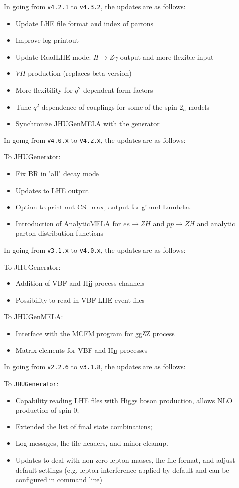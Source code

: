 \documentclass[aps,superscriptaddress,nofootinbib]{revtex4}
\begin{document}
\noindent
In going from \verb|v4.2.1| to \verb|v4.3.2|, the updates are as follows:

\begin{itemize}
\item Update LHE file format and index of partons
\item Improve log printout
\item Update ReadLHE mode: $H\to Z\gamma$ output and more flexible input
\item $VH$ production (replaces beta version)
\item More flexibility for $q^2$-dependent form factors
\item Tune $q^2$-dependence of couplings for some of the spin-$2_h$ models
\item Synchronize JHUGenMELA with the generator
\end{itemize}

\noindent
In going from \verb|v4.0.x| to \verb|v4.2.x|, the updates are as follows:

To JHUGenerator:
\begin{itemize}
\item Fix BR in "all" decay mode
\item Updates to LHE output
\item Option to print out CS\_max, output for g' and Lambdas
\item Introduction of AnalyticMELA for $ee \to ZH$ and $pp \to ZH$ and analytic parton distribution functions
\end{itemize}


\noindent
In going from \verb|v3.1.x| to \verb|v4.0.x|, the updates are as follows:

To JHUGenerator:
\begin{itemize}
\item Addition of VBF and Hjj process channels
\item Possibility to read in VBF LHE event files
\end{itemize}

To JHUGenMELA:
\begin{itemize}
\item Interface with the MCFM program for ggZZ process
\item Matrix elements for VBF and Hjj processes
\end{itemize}


\noindent
In going from \verb|v2.2.6| to \verb|v3.1.8|, the updates are as follows:

To \verb|JHUGenerator|:
\begin{itemize}
\item Capability reading LHE files with Higgs boson production, allows NLO production of spin-0;
\item Extended the list of final state combinations;
\item Log messages, lhe file headers, and minor cleanup.
\item Updates to deal with non-zero lepton masses, lhe file format, and adjust default settings (e.g. lepton interference applied by default and can be configured in command line)
\end{itemize}
\end{document}
